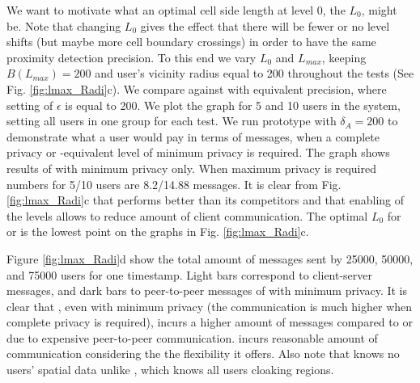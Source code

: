 We want to motivate what an optimal cell side length at level 0, the $L_0$,
might be. Note that changing $L_0$ gives the effect that there will be fewer
or no level shifts (but maybe more cell boundary crossings) in order to have the
same proximity detection precision. To this end we vary $L_0$ and $L_{max}$,
keeping $B(L_{max})=200$ and user's vicinity radius equal to 200 throughout the
tests (See Fig. \ref{fig:lmax_Radi}c). We compare against \ff with equivalent
precision, where setting of $\epsilon$ is equal to 200. We plot the
graph for 5 and 10 users in the system, setting all users in one group for each
test. 
We run \hc prototype with $\delta_A=200$ to demonstrate what a user would
pay in terms of messages, when a complete privacy or \vl-equivalent level of
minimum privacy is required. The graph shows results of \hc with minimum privacy
only. When maximum privacy is required numbers for 5/10 users are 8.2/14.88
messages. It is clear from Fig. \ref{fig:lmax_Radi}c that \vl performs better
than its competitors and that enabling of the levels allows to reduce amount of
client communication. The optimal $L_0$ for \vl or \ff is the lowest point on
the graphs in Fig. \ref{fig:lmax_Radi}c.



Figure \ref{fig:lmax_Radi}d show the total amount of messages sent by 25000,
50000, and 75000 users for one timestamp. Light bars correspond to client-server
messages, and dark bars to peer-to-peer messages of \hc with minimum privacy.
It is clear that \hc, even with minimum privacy (the communication is much
higher when complete privacy is required), incurs a higher amount of messages
compared to \vl or \ff due to expensive peer-to-peer communication. \vl
incurs reasonable amount of communication considering the the flexibility it
offers. Also note that \vl knows no users' spatial data unlike \hc, which
knows all users cloaking regions.
